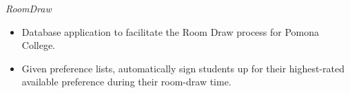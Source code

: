 {\sl RoomDraw}
\begin{itemize} \itemsep -2pt %
\item Database application to facilitate the Room Draw process for Pomona College.
\item Given preference lists, automatically sign students up for their highest-rated available preference during their room-draw time.
\end{itemize}
